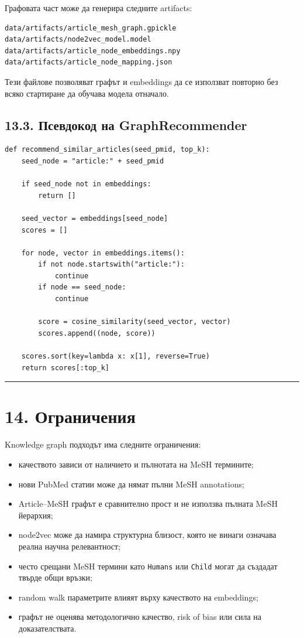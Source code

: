 \documentclass[12pt,a4paper]{article}
\providecommand{\tightlist}{\setlength{\itemsep}{0pt}\setlength{\parskip}{0pt}}
\begin{document}
Графовата част може да генерира следните artifacts:

\begin{verbatim}
data/artifacts/article_mesh_graph.gpickle
data/artifacts/node2vec_model.model
data/artifacts/article_node_embeddings.npy
data/artifacts/article_node_mapping.json
\end{verbatim}

Тези файлове позволяват графът и embeddings да се използват повторно без всяко стартиране да обучава модела отначало.

\subsection{13.3. Псевдокод на GraphRecommender}

\begin{verbatim}
def recommend_similar_articles(seed_pmid, top_k):
    seed_node = "article:" + seed_pmid

    if seed_node not in embeddings:
        return []

    seed_vector = embeddings[seed_node]
    scores = []

    for node, vector in embeddings.items():
        if not node.startswith("article:"):
            continue
        if node == seed_node:
            continue

        score = cosine_similarity(seed_vector, vector)
        scores.append((node, score))

    scores.sort(key=lambda x: x[1], reverse=True)
    return scores[:top_k]
\end{verbatim}

\vspace{0.5em}\hrule\vspace{1.0em}

\section{14. Ограничения}

Knowledge graph подходът има следните ограничения:

\begin{itemize}
\tightlist
\item
  качеството зависи от наличието и пълнотата на MeSH термините;
\item
  нови PubMed статии може да нямат пълни MeSH annotations;
\item
  Article--MeSH графът е сравнително прост и не използва пълната MeSH йерархия;
\item
  node2vec може да намира структурна близост, която не винаги означава реална научна релевантност;
\item
  често срещани MeSH термини като \texttt{Humans} или \texttt{Child} могат да създадат твърде общи връзки;
\item
  random walk параметрите влияят върху качеството на embeddings;
\item
  графът не оценява методологично качество, risk of bias или сила на доказателствата.
\end{itemize}
\end{document}
